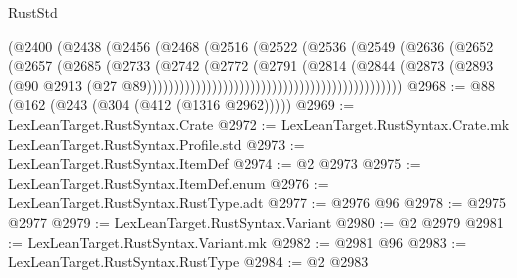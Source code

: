 \begin{lexlean}{RustStd}
\begin{coremodule}
                                                      (@2400
                                                        (@2438
                                                          (@2456
                                                            (@2468
                                                              (@2516
                                                                (@2522
                                                                  (@2536
                                                                    (@2549
                                                                      (@2636
                                                                        (@2652
                                                                          (@2657
                                                                            (@2685
                                                                              (@2733
                                                                                (@2742
                                                                                  (@2772
                                                                                    (@2791
                                                                                      (@2814
                                                                                        (@2844
                                                                                          (@2873
                                                                                            (@2893
                                                                                              (@90
                                                                                                @2913
                                                                                                (@27
                                                                                                  @89)))))))))))))))))))))))))))))))))))))))))))))))
@2968 := @88 (@162 (@243 (@304 (@412 (@1316 @2962)))))
@2969 := LexLeanTarget.RustSyntax.Crate
@2972 := LexLeanTarget.RustSyntax.Crate.mk LexLeanTarget.RustSyntax.Profile.std
@2973 := LexLeanTarget.RustSyntax.ItemDef
@2974 := @2 @2973
@2975 := LexLeanTarget.RustSyntax.ItemDef.enum
@2976 := LexLeanTarget.RustSyntax.RustType.adt
@2977 := @2976 @96
@2978 := @2975 @2977
@2979 := LexLeanTarget.RustSyntax.Variant
@2980 := @2 @2979
@2981 := LexLeanTarget.RustSyntax.Variant.mk
@2982 := @2981 @96
@2983 := LexLeanTarget.RustSyntax.RustType
@2984 := @2 @2983

\end{coremodule}
\end{lexlean}
